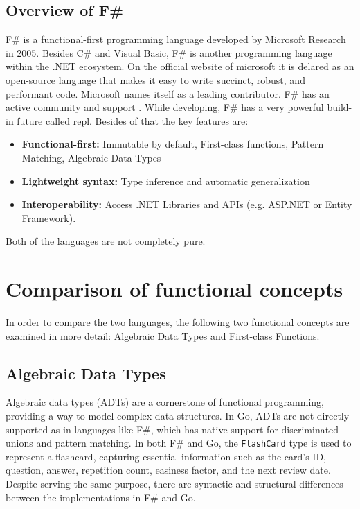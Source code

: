     \section{Overview of F\#}\label{sec:fsharp-overview}
    F\# is a functional-first programming language developed by Microsoft Research in 2005.
    Besides C\# and Visual Basic, F\# is another programming language within the .NET ecosystem. On the official website of microsoft it is delared as an open-source language that makes it easy to write succinct, robust, and performant code. Microsoft names itself as a leading contributor. F\# has an active community and support \cite{fsharpfoundation}.
    While developing, F\# has a very powerful build-in future called \ac{repl}. Besides of that the key features are:
    \begin{itemize}
        \item \textbf{Functional-first:} Immutable by default, First-class functions, Pattern Matching, Algebraic Data Types 
        \item \textbf{Lightweight syntax:} Type inference and automatic generalization
        \item \textbf{Interoperability:} Access .NET Libraries and APIs (e.g. ASP.NET or Entity Framework). 
    \end{itemize}
    \cite{dotnet}
    \cite{keyfeaturesfsharp}
    Both of the languages are not completely pure.


\chapter{Comparison of functional concepts}\label{chap:comparison}
In order to compare the two languages, the following two functional concepts are examined in more detail: Algebraic Data Types and First-class Functions. 

    \section{Algebraic Data Types}\label{sec:algebraic-data-types}

    Algebraic data types (ADTs) are a cornerstone of functional programming, providing a way to model complex data structures. In Go, ADTs are not directly supported as in languages like F\#, which has native support for discriminated unions and pattern matching. In both F\# and Go, the \texttt{FlashCard} type is used to represent a flashcard, capturing essential information such as the card's ID, question, answer, repetition count, easiness factor, and the next review date. Despite serving the same purpose, there are syntactic and structural differences between the implementations in F\# and Go.

